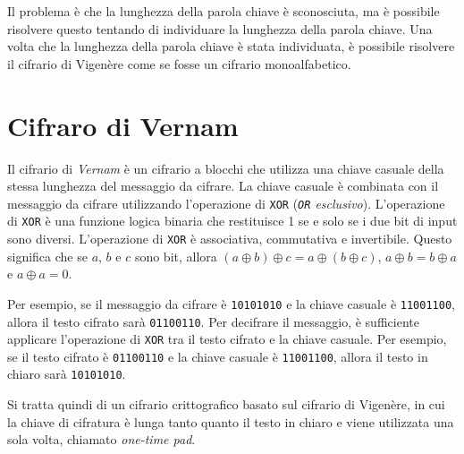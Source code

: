 Il problema è che la lunghezza della parola chiave è sconosciuta, ma è possibile risolvere questo
tentando di individuare la lunghezza della parola chiave. Una volta che la lunghezza della parola
chiave è stata individuata, è possibile risolvere il cifrario di Vigenère come se fosse un cifrario
monoalfabetico.
\section{Cifraro di Vernam}
Il cifrario di \textit{Vernam} è un cifrario a blocchi che utilizza una chiave casuale della stessa
lunghezza del messaggio da cifrare. La chiave casuale è combinata con il messaggio da cifrare
utilizzando l'operazione di \texttt{XOR} (\textit{\texttt{OR} esclusivo}). L'operazione di \texttt{XOR}
è una funzione logica
binaria che restituisce 1 se e solo se i due bit di input sono diversi. L'operazione di \texttt{XOR} è
associativa, commutativa e invertibile. Questo significa che se $a$, $b$ e $c$ sono bit, allora
$(a \oplus b) \oplus c = a \oplus (b \oplus c)$, $a \oplus b = b \oplus a$ e $a \oplus a = 0$.

Per esempio, se il messaggio da cifrare è \texttt{10101010} e la chiave casuale è \texttt{11001100},
allora il testo cifrato sarà \texttt{01100110}. Per decifrare il messaggio, è sufficiente applicare
l'operazione di \texttt{XOR} tra il testo cifrato e la chiave casuale. Per esempio, se il testo cifrato
è \texttt{01100110} e la chiave casuale è \texttt{11001100}, allora il testo in chiaro sarà
\texttt{10101010}.

Si tratta quindi di un cifrario crittografico basato sul cifrario di Vigenère, in cui la chiave di 
cifratura è lunga tanto quanto il testo in chiaro e viene utilizzata una sola volta, chiamato 
\textit{one-time pad}. 
